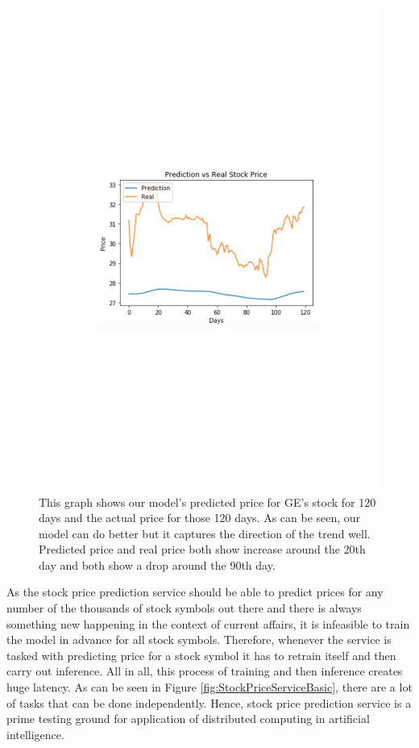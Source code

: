 \documentclass{report}
\begin{document}
\begin{figure}
  \includegraphics[width=\textwidth]{PredictionRealPrice.pdf}
  \caption{This graph shows our model's predicted price for GE's stock for 120 days and the actual price for those 120 days. As can be seen, our model can do better but it captures the direction of the trend well. Predicted price and real price both show increase around the 20th day and both show a drop around the 90th day.}
  \label{fig:PredictionRealPrice}
\end{figure}

As the stock price prediction service should be able to predict prices for any number of the thousands of stock symbols out there and there is always something new happening in the context of current affairs, it is infeasible to train the model in advance for all stock symbols. Therefore, whenever the service is tasked with predicting price for a stock symbol it has to retrain itself and then carry out inference. All in all, this process of training and then inference creates huge latency. As can be seen in Figure \ref{fig:StockPriceServiceBasic}, there are a lot of tasks that can be done independently. Hence, stock price prediction service is a prime testing ground for application of distributed computing in artificial intelligence.
\end{document}
